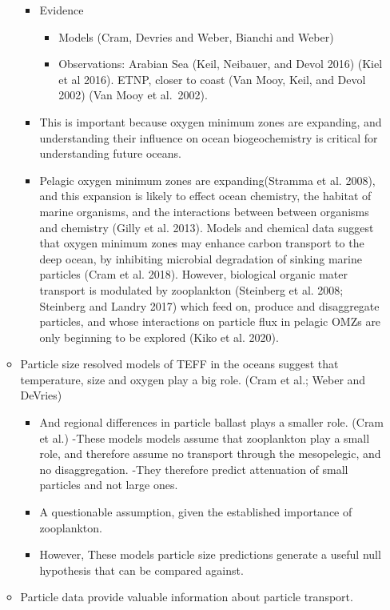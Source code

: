 \documentclass[]{article}
\providecommand{\tightlist}{%
  \setlength{\itemsep}{0pt}\setlength{\parskip}{0pt}}
\begin{document}
\begin{itemize}
\begin{itemize}
    \begin{itemize}
    \tightlist
    \item
      Evidence

      \begin{itemize}
      \tightlist
      \item
        Models (Cram, Devries and Weber, Bianchi and Weber)
      \item
        Observations: Arabian Sea (Keil, Neibauer, and Devol 2016) (Kiel
        et al 2016). ETNP, closer to coast (Van Mooy, Keil, and Devol
        2002) (Van Mooy et al.~2002).
      \end{itemize}
    \item
      This is important because oxygen minimum zones are expanding, and
      understanding their influence on ocean biogeochemistry is critical
      for understanding future oceans.
    \item
      Pelagic oxygen minimum zones are expanding(Stramma et al. 2008),
      and this expansion is likely to effect ocean chemistry, the
      habitat of marine organisms, and the interactions between between
      organisms and chemistry (Gilly et al. 2013). Models and chemical
      data suggest that oxygen minimum zones may enhance carbon
      transport to the deep ocean, by inhibiting microbial degradation
      of sinking marine particles (Cram et al. 2018). However,
      biological organic mater transport is modulated by zooplankton
      (Steinberg et al. 2008; Steinberg and Landry 2017) which feed on,
      produce and disaggregate particles, and whose interactions on
      particle flux in pelagic OMZs are only beginning to be explored
      (Kiko et al. 2020).
    \end{itemize}
  \item
    Particle size resolved models of TEFF in the oceans suggest that
    temperature, size and oxygen play a big role. (Cram et al.; Weber
    and DeVries)

    \begin{itemize}
    \tightlist
    \item
      And regional differences in particle ballast plays a smaller role.
      (Cram et al.) -These models models assume that zooplankton play a
      small role, and therefore assume no transport through the
      mesopelegic, and no disaggregation. -They therefore predict
      attenuation of small particles and not large ones.
    \item
      A questionable assumption, given the established importance of
      zooplankton.
    \item
      However, These models particle size predictions generate a useful
      null hypothesis that can be compared against.
    \end{itemize}
  \item
    Particle data provide valuable information about particle transport.


\end{itemize}
\end{itemize}
\end{document}
